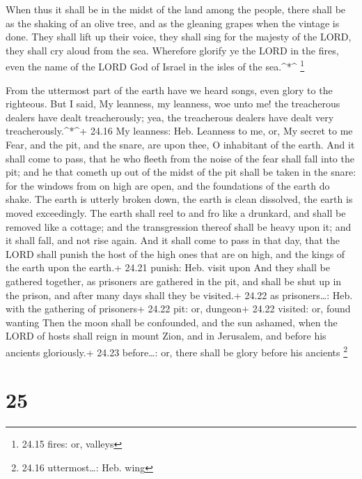  When thus it shall be in the midst of the land among the
people, there shall be as the shaking of an olive tree, and as the
gleaning grapes when the vintage is done.  They shall lift
up their voice, they shall sing for the majesty of the LORD, they shall
cry aloud from the sea.  Wherefore glorify ye the LORD in
the fires, even the name of the LORD God of Israel in the isles of the
sea.\^{}*\^{} \footnote{24.15 fires: or, valleys}

 From the uttermost part of the earth have we heard songs,
even glory to the righteous. But I said, My leanness, my leanness, woe
unto me! the treacherous dealers have dealt treacherously; yea, the
treacherous dealers have dealt very treacherously.\^{}*\^{}+ 24.16 My
leanness: Heb. Leanness to me, or, My secret to me  Fear,
and the pit, and the snare, are upon thee, O inhabitant of the earth.
 And it shall come to pass, that he who fleeth from the
noise of the fear shall fall into the pit; and he that cometh up out of
the midst of the pit shall be taken in the snare: for the windows from
on high are open, and the foundations of the earth do shake.
 The earth is utterly broken down, the earth is clean
dissolved, the earth is moved exceedingly.  The earth shall
reel to and fro like a drunkard, and shall be removed like a cottage;
and the transgression thereof shall be heavy upon it; and it shall fall,
and not rise again.  And it shall come to pass in that day,
that the LORD shall punish the host of the high ones that are on high,
and the kings of the earth upon the earth.+ 24.21 punish: Heb. visit
upon  And they shall be gathered together, as prisoners are
gathered in the pit, and shall be shut up in the prison, and after many
days shall they be visited.+ 24.22 as prisoners\ldots: Heb. with the
gathering of prisoners+ 24.22 pit: or, dungeon+ 24.22 visited: or, found
wanting  Then the moon shall be confounded, and the sun
ashamed, when the LORD of hosts shall reign in mount Zion, and in
Jerusalem, and before his ancients gloriously.+ 24.23 before\ldots: or,
there shall be glory before his ancients \footnote{24.16
  uttermost\ldots: Heb. wing}

\hypertarget{section-24}{%
\section{25}\label{section-24}}

